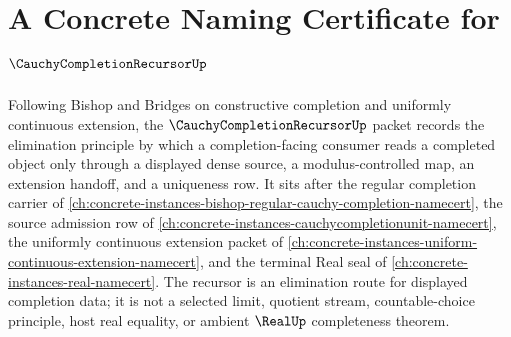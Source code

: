 \chapter{A Concrete Naming Certificate for $\CauchyCompletionRecursorUp$}
\label{ch:concrete-instances-cauchy-completion-recursor-namecert}

Following Bishop and Bridges on constructive completion and uniformly continuous extension, the $\CauchyCompletionRecursorUp$ packet records the elimination principle by which a completion-facing consumer reads a completed object only through a displayed dense source, a modulus-controlled map, an extension handoff, and a uniqueness row. It sits after the regular completion carrier of \autoref{ch:concrete-instances-bishop-regular-cauchy-completion-namecert}, the source admission row of \autoref{ch:concrete-instances-cauchycompletionunit-namecert}, the uniformly continuous extension packet of \autoref{ch:concrete-instances-uniform-continuous-extension-namecert}, and the terminal Real seal of \autoref{ch:concrete-instances-real-namecert}. The recursor is an elimination route for displayed completion data; it is not a selected limit, quotient stream, countable-choice principle, host real equality, or ambient $\RealUp$ completeness theorem.

